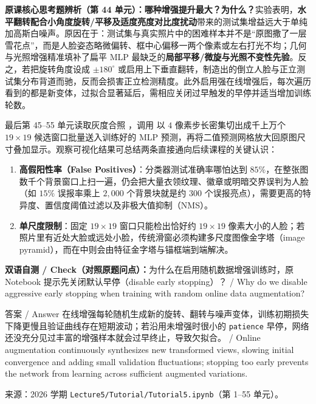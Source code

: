 \textbf{原课核心思考题辨析（第 44 单元）：哪种增强提升最大？为什么？}实验表明，\textbf{水平翻转配合小角度旋转/平移及适度亮度对比度扰动}带来的测试集增益远大于单纯加高斯白噪声。原因在于：测试集与真实照片中的困难样本并不是“原图撒了一层雪花点”，而是人脸姿态略微偏转、框中心偏移一两个像素或左右打光不均；几何与光照增强精准填补了扁平 MLP 最缺乏的\textbf{局部平移/微旋与光照不变性先验}。反之，若把旋转角度设成 $\pm 180^\circ$ 或启用上下垂直翻转，制造出的倒立人脸与正立测试集分布背道而驰，反而会损害正立检测精度。此外启用强在线增强后，每次遍历看到的都是新变体，过拟合显著延后，需相应关闭过早触发的早停并适当增加训练轮数。



最后第 45–55 单元读取灰度合照 ，调用  以 $4$ 像素步长密集切出成千上万个 $19\times 19$ 候选窗口批量送入训练好的 MLP 预测，再将二值预测网格放大回原图尺寸叠加显示。观察可视化结果可总结两条直接通向后续课程的关键认识：
\begin{enumerate}
\item \textbf{高假阳性率（False Positives）}：分类器测试准确率哪怕达到 $85\%$，在整张图数千个背景窗口上扫一遍，仍会把大量衣领纹理、徽章或明暗交界误判为人脸（如 $15\%$ 误报率乘上 $2{,}000$ 个背景块就是约 $300$ 个误报亮点），需要更高的特异度、置信度阈值过滤以及非极大值抑制（NMS）。
\item \textbf{单尺度限制}：固定 $19\times 19$ 窗口只能检出恰好约 $19\times 19$ 像素大小的人脸；若照片里有近处大脸或远处小脸，传统滑窗必须构建多尺度图像金字塔（image pyramid），而在中则会由特征金字塔与锚框端到端解决。
\end{enumerate}

\textbf{双语自测 / Check（对照原题问点）：}为什么在启用随机数据增强训练时，原 Notebook 提示先关闭默认早停（disable early stopping）？ / Why do we disable aggressive early stopping when training with random online data augmentation?

\begin{StudySolution}{答案 / Answer}
在线增强每轮随机生成新的旋转、翻转与噪声变体，训练初期损失下降更慢且验证曲线存在短期波动；若沿用未增强时很小的 \texttt{patience} 早停，网络还没充分见过丰富的增强样本就会过早终止，导致欠拟合。 / Online augmentation continuously synthesizes new transformed views, slowing initial convergence and adding small validation fluctuations; stopping too early prevents the network from learning across sufficient augmented variations.
\end{StudySolution}

来源：2026 学期 \texttt{Lecture5/Tutorial/Tutorial5.ipynb}（第 1–55 单元）。
